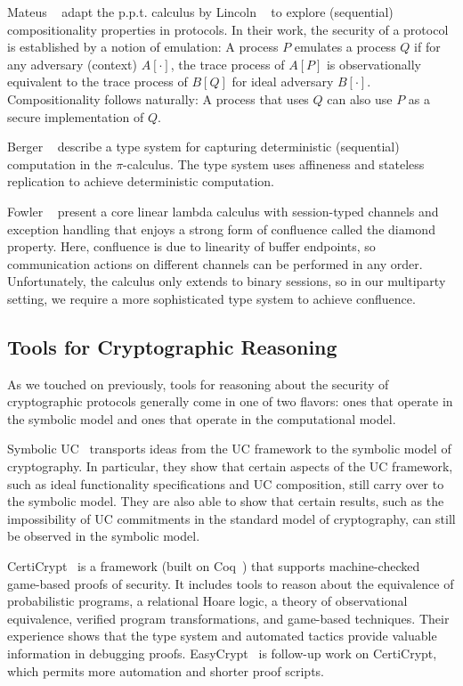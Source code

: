Mateus \etal~\cite{mateus2003composition} adapt the p.p.t. calculus by Lincoln
\etal~\cite{lincoln1998probabilistic} to explore (sequential) compositionality
properties in protocols. In their work, the security of a protocol is
established by a notion of emulation: A process $P$ emulates a process $Q$ if
for any adversary (context) $A[\cdot]$, the trace process of $A[P]$ is
observationally equivalent to the trace process of $B[Q]$ for ideal adversary
$B[\cdot]$. Compositionality follows naturally: A process that uses $Q$ can also use
$P$ as a secure implementation of $Q$.


Berger \etal~\cite{berger2001sequentiality} describe a type system for capturing
deterministic (sequential) computation in the $\pi$-calculus. The type system uses
affineness and stateless replication to achieve deterministic
computation. 

Fowler \etal~\cite{fowler2018session} present a core linear lambda calculus with
session-typed channels and exception handling that enjoys a strong form of
confluence called the diamond property. Here, confluence is due to linearity of
buffer endpoints, so communication actions on different channels can be
performed in any order. Unfortunately, the calculus only extends to binary
sessions, so in our multiparty setting, we require a more sophisticated type
system to achieve confluence.

\subsection{Tools for Cryptographic Reasoning}
\label{subsec:tools}

As we touched on previously, tools for reasoning about the security of
cryptographic protocols generally come in one of two flavors: ones that operate
in the symbolic model and ones that operate in the computational model.

Symbolic UC~\cite{bohl2016symbolic} transports ideas from the UC framework to
the symbolic model of cryptography. In particular, they show that certain
aspects of the UC framework, such as ideal functionality specifications and UC
composition, still carry over to the symbolic model. They are also able to show
that certain results, such as the impossibility of UC commitments in the
standard model of cryptography, can still be observed in the symbolic model.

CertiCrypt~\cite{barthe2009formal} is a framework (built on
Coq~\cite{barras1997coq}) that supports machine-checked game-based proofs of
security. It includes tools to reason about the equivalence of probabilistic
programs, a relational Hoare logic, a theory of observational equivalence,
verified program transformations, and game-based techniques.  Their experience
shows that the type system and automated tactics provide valuable information in
debugging proofs. EasyCrypt~\cite{barthe2011computer} is follow-up work on
CertiCrypt, which permits more automation and shorter proof
scripts. 

